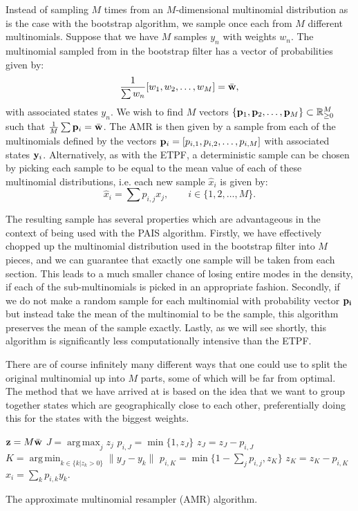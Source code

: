 \documentclass[final]{siamltex}
\renewcommand{\b}[1]{{\bf #1}}
\DeclareMathOperator*{\argmin}{arg\,min}
\DeclareMathOperator*{\argmax}{arg\,max}
\begin{document}
Instead of sampling $M$ times from an $M$-dimensional multinomial
distribution as is the case with the bootstrap algorithm, we sample
once each from $M$ different multinomials. Suppose that we have $M$
samples $y_n$ with weights $w_n$. The multinomial sampled from in the
bootstrap filter has a vector of probabilities given by:
\begin{equation*}
\frac{1}{\sum w_n} [w_1,w_2,\ldots,w_M] = \bar{\bf w},
\end{equation*}
with associated states $y_n$.
We wish to find $M$ vectors $\{{\bf p}_1,{\bf p}_2,\ldots,{\bf p}_M\}
\subset \mathbb{R}^M_{\ge 0}$
such that  $\frac{1}{M} \sum {\bf p}_i = \bar{\bf w}$. The AMR is then
given by a sample from each of the multinomials defined by the vectors
${\bf p}_i = [p_{i,1},p_{i,2},\ldots,p_{i,M}]$ with associated states ${\bf y}_i$. Alternatively, as with the ETPF, a deterministic sample
can be chosen by picking each sample to be equal to the mean value of
each of these multinomial distributions, i.e. each new sample
$\hat{x}_i$ is given by:
\begin{equation}
\hat{x}_i = \sum p_{i,j} x_j, \qquad i \in \{1,2,\ldots,M\}.
\end{equation}

The resulting sample has several properties which are advantageous in
the context of being used with the PAIS algorithm. Firstly, we have
effectively chopped up the multinomial distribution used in the
bootstrap filter into $M$ pieces, and we can guarantee that exactly
one sample will be taken from each section. This leads to a much
smaller chance of losing entire modes in the density, if each of the
sub-multinomials is picked in an appropriate fashion. Secondly, if we do not make a random sample for
each multinomial with probability vector $\bf p_i$ but instead take
the mean of the multinomial to be the sample, this algorithm preserves
the mean of the sample exactly. Lastly, as we will see shortly, this
algorithm is significantly less computationally intensive than the
ETPF.

There are of course infinitely many different ways that one could use
to split the original multinomial up into $M$ parts, some of which
will be far from optimal. The method that we have arrived at is based
on the idea that we want to group together states which are
geographically close to each other, preferentially doing this 
for the states with the biggest weights. 

\begin{table}
\begin{mdframed}
\begin{algorithmic}
\STATE $\b{z} = M\bar{\b{w}}$
\STATE $J = \argmax_j z_j$
\STATE $p_{i,J} = \min\{1,z_J\}$
\STATE $z_J = z_J - p_{i,J}$
\STATE $K = \argmin_{k \in \{k|z_k>0\}} \|y_J - y_k\|$
\STATE $p_{i,K} = \min\{1-\sum_j p_{i,j}, z_K\}$
\STATE $z_K = z_K - p_{i,K}$
\ENDWHILE
\STATE $x_i = \sum_k p_{i,k}y_k$.
\ENDFOR
\end{algorithmic}
\end{mdframed}
\caption{The approximate multinomial resampler (AMR) algorithm.\label{tab:AMR}}
\end{table}
\end{document}
